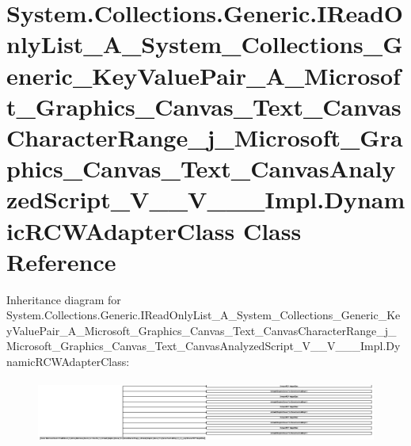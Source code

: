 \hypertarget{class_system_1_1_collections_1_1_generic_1_1_i_read_only_list___a___system___collections___generdec03126cb21efe263930a396eccb785}{}\section{System.\+Collections.\+Generic.\+I\+Read\+Only\+List\+\_\+\+A\+\_\+\+System\+\_\+\+Collections\+\_\+\+Generic\+\_\+\+Key\+Value\+Pair\+\_\+\+A\+\_\+\+Microsoft\+\_\+\+Graphics\+\_\+\+Canvas\+\_\+\+Text\+\_\+\+Canvas\+Character\+Range\+\_\+j\+\_\+\+Microsoft\+\_\+\+Graphics\+\_\+\+Canvas\+\_\+\+Text\+\_\+\+Canvas\+Analyzed\+Script\+\_\+\+V\+\_\+\+\_\+\+V\+\_\+\+\_\+\+\_\+\+Impl.\+Dynamic\+R\+C\+W\+Adapter\+Class Class Reference}
\label{class_system_1_1_collections_1_1_generic_1_1_i_read_only_list___a___system___collections___generdec03126cb21efe263930a396eccb785}
Inheritance diagram for System.\+Collections.\+Generic.\+I\+Read\+Only\+List\+\_\+\+A\+\_\+\+System\+\_\+\+Collections\+\_\+\+Generic\+\_\+\+Key\+Value\+Pair\+\_\+\+A\+\_\+\+Microsoft\+\_\+\+Graphics\+\_\+\+Canvas\+\_\+\+Text\+\_\+\+Canvas\+Character\+Range\+\_\+j\+\_\+\+Microsoft\+\_\+\+Graphics\+\_\+\+Canvas\+\_\+\+Text\+\_\+\+Canvas\+Analyzed\+Script\+\_\+\+V\+\_\+\+\_\+\+V\+\_\+\+\_\+\+\_\+\+Impl.\+Dynamic\+R\+C\+W\+Adapter\+Class\+:\begin{figure}[H]
\begin{center}
\leavevmode
\includegraphics[height=2.100955cm]{class_system_1_1_collections_1_1_generic_1_1_i_read_only_list___a___system___collections___generdec03126cb21efe263930a396eccb785}
\end{center}
\end{figure}
